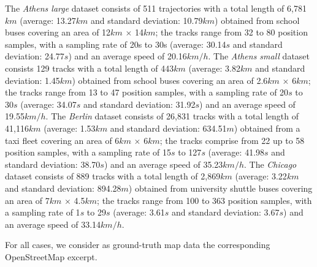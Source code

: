 \documentclass[natbib]{svjour3}                    \smartqed  \usepackage[table]{xcolor}
\begin{document}
The \emph{Athens large} dataset consists of 511 trajectories with a total length of 6,781$km$ (average: 13.27$km$ and standard deviation: 10.79$km$) obtained from school buses covering an area of 12$km$ $\times$ 14$km$; the tracks range from 32 to 80 position samples, with a sampling rate of 20s to 30s (average: 30.14$s$ and standard deviation: 24.77$s$) and an average speed of 20.16$km/h$.  
The \emph{Athens small} dataset consists 129 tracks with a total length of 443$km$ (average: 3.82$km$ and standard deviation: 1.45$km$) obtained from school buses covering an area of 2.6$km$ $\times$ 6$km$; the tracks range from 13 to 47 position samples, with a sampling rate of 20$s$ to 30$s$ (average: 34.07$s$ and standard deviation: 31.92$s$) and an average speed of 19.55$km/h$. 
The \emph{Berlin} dataset consists of 26,831 tracks with a total length of 41,116$km$ (average: 1.53$km$ and standard deviation: 634.51$m$) obtained from a taxi fleet covering an area of 6$km$ $\times$ 6$km$; the tracks comprise from 22  up to 58 position samples, with a sampling rate of 15$s$ to 127$s$ (average: 41.98$s$ and standard deviation: 38.70$s$) and an average speed of 35.23$km/h$. 
The \emph{Chicago} dataset \cite{be-irmgp-12,Biagioni:2012:MIF:2424321.2424333} consists of 889 tracks with a total length of 2,869$km$ (average: 3.22$km$ and standard deviation: 894.28$m$) obtained from university shuttle buses covering an area of 7$km$ $\times$ 4.5$km$; the tracks range from 100 to 363 position samples, with a sampling rate of 1$s$ to 29$s$ (average: 3.61$s$ and standard deviation: 3.67$s$) and an average speed of 33.14$km/h$. 

For all cases, we consider as ground-truth map data the corresponding OpenStreetMap excerpt. 
\end{document}
